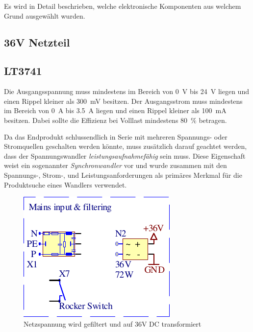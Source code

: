 Es wird  in  Detail  beschrieben,  welche  elektronische Komponenten aus welchem
Grund ausgew\"ahlt wurden.

\subsection{36V Netzteil}



\subsection{LT3741}

Die  Ausgangsspannung   muss   mindestens   im  Bereich  von  \SI{0}{\volt}  bis
\SI{24}{\volt}  liegen  und   einen  Rippel  kleiner  als  \SI{300}{\milli\volt}
besitzen.  Der  Ausgangsstrom muss mindestens im Bereich von \SI{0}{\ampere} bis
\SI{3.5}{\ampere} liegen  und  einen  Rippel kleiner als \SI{100}{\milli\ampere}
besitzen. Dabei  sollte  die Effizienz bei Volllast mindestens \SI{80}{\percent}
betragen.

Da  das  Endprodukt  schlussendlich  in  Serie  mit  mehreren   Spannungs-  oder
Stromquellen  geschalten  werden  k\"onnte, muss  zus\"atzlich  darauf  geachtet
werden,  dass  der Spannungswandler \emph{leistungsaufnahmef\"ahig}  sein  muss.
Diese Eigenschaft weist  ein  sogenannter  \emph{Synchronwandler}  vor und wurde
zusammen mit den Spannungs-,  Strom-,  und Leistungsanforderungen als prim\"ares
Merkmal f\"ur die Produktsuche eines Wandlers verwendet.



\begin{figure}[H]
    \center
    \includegraphics[width=.35\textwidth]{images/circuit/mains-input.pdf}
    \caption{Netzspannung wird gefiltert und auf 36V DC transformiert}
    \label{fig:circuit:mains-input}
\end{figure}

